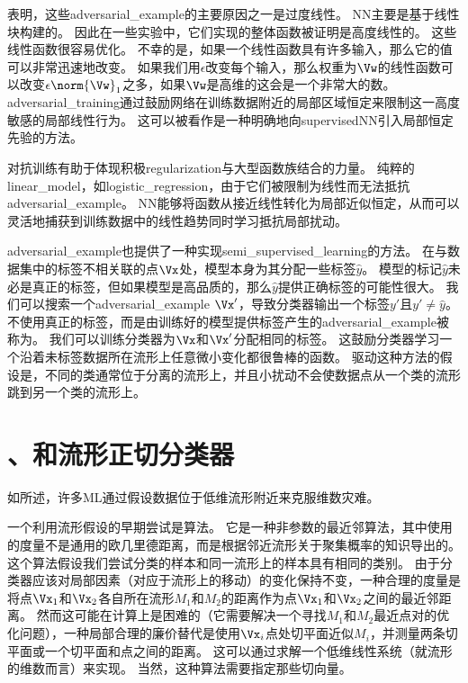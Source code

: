 \cite{Goodfellow-2015-adversarial}表明，这些\gls{adversarial_example}的主要原因之一是过度线性。
\gls{NN}主要是基于线性块构建的。
因此在一些实验中，它们实现的整体函数被证明是高度线性的。
这些线性函数很容易优化。
不幸的是，如果一个线性函数具有许多输入，那么它的值可以非常迅速地改变。
如果我们用$\epsilon$改变每个输入，那么权重为$\Vw$的线性函数可以改变$\epsilon \norm{\Vw}_1$之多，如果$\Vw$是高维的这会是一个非常大的数。
\gls{adversarial_training}通过鼓励网络在训练数据附近的局部区域恒定来限制这一高度敏感的局部线性行为。
这可以被看作是一种明确地向\gls{supervised}\gls{NN}引入局部恒定先验的方法。

对抗训练有助于体现积极\gls{regularization}与大型函数族结合的力量。
纯粹的\gls{linear_model}，如\gls{logistic_regression}，由于它们被限制为线性而无法抵抗\gls{adversarial_example}。
\gls{NN}能够将函数从接近线性转化为局部近似恒定，从而可以灵活地捕获到训练数据中的线性趋势同时学习抵抗局部扰动。

\gls{adversarial_example}也提供了一种实现\gls{semi_supervised_learning}的方法。
在与数据集中的标签不相关联的点$\Vx$处，模型本身为其分配一些标签$\hat y$。
模型的标记$\hat y$未必是真正的标签，但如果模型是高品质的，那么$\hat y$提供正确标签的可能性很大。
我们可以搜索一个\gls{adversarial_example} $\Vx'$，导致分类器输出一个标签$y'$且$y' \neq \hat y$。
不使用真正的标签，而是由训练好的模型提供标签产生的\gls{adversarial_example}被称为\citep{miyato2015distributional}。
我们可以训练分类器为$\Vx$和$\Vx'$分配相同的标签。
这鼓励分类器学习一个沿着未标签数据所在流形上任意微小变化都很鲁棒的函数。
驱动这种方法的假设是，不同的类通常位于分离的流形上，并且小扰动不会使数据点从一个类的流形跳到另一个类的流形上。


\section{、和流形正切分类器}
\label{sec:tangent_distance_tangent_prop_and_manifold_tangent_classifier}
如所述，许多\gls{ML}通过假设数据位于低维流形附近来克服维数灾难。

一个利用流形假设的早期尝试是算法\citep{Simard93-small,Simard98}。
它是一种非参数的最近邻算法，其中使用的度量不是通用的欧几里德距离，而是根据邻近流形关于聚集概率的知识导出的。
这个算法假设我们尝试分类的样本和同一流形上的样本具有相同的类别。
由于分类器应该对局部因素（对应于流形上的移动）的变化保持不变，一种合理的度量是将点$\Vx_1$和$\Vx_2$各自所在流形$M_1$和$M_2$的距离作为点$\Vx_1$和$\Vx_2$之间的最近邻距离。
然而这可能在计算上是困难的（它需要解决一个寻找$M_1$和$M_2$最近点对的优化问题），一种局部合理的廉价替代是使用$\Vx_i$点处切平面近似$M_i$，并测量两条切平面或一个切平面和点之间的距离。
这可以通过求解一个低维线性系统（就流形的维数而言）来实现。
当然，这种算法需要指定那些切向量。

